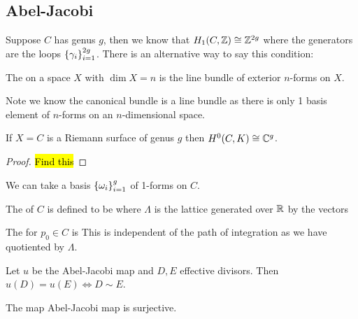 \documentclass{article}
\begin{document}
\subsection{Abel-Jacobi}
Suppose $C$ has genus $g$, then we know that $H_1(C,\mathbb{Z}) \cong \mathbb{Z}^{2g}$ where the generators are the loops $\left\{ \gamma_i \right\}_{i=1}^{2g}$. There is an alternative way to say this condition:
\begin{definition}
The  on a space $X$ with $\dim X = n$ is the line bundle of exterior $n$-forms on $X$.  
\end{definition}
\begin{remark}
Note we know the canonical bundle is a line bundle as there is only 1 basis element of $n$-forms on an $n$-dimensional space. 
\end{remark}
\begin{prop}
If $X=C$ is a Riemann surface of genus $g$ then $H^0(C,K)\cong \mathbb{C}^g$. 
\end{prop}
\begin{proof}
\hl{Find this}
\end{proof}
\begin{corollary}
We can take a basis $\left\{ \omega_i \right\}_{i=1}^g$ of 1-forms on $C$. 
\end{corollary}
\begin{definition}
The  of $C$ is defined to be 
where $\Lambda$ is the lattice generated over $\mathbb{R}$ by the vectors 
\end{definition}

\begin{definition}
The  for $p_0 \in C$ is 
This is independent of the path of integration as we have quotiented by $\Lambda$. 
\end{definition}

\begin{theorem}
	Let $u$ be the Abel-Jacobi map and $D,E$ effective divisors. Then $u(D) = u(E) \Leftrightarrow D \sim E$. 
\end{theorem}

\begin{theorem}
	The map Abel-Jacobi map is surjective. 
\end{theorem}
\end{document}
